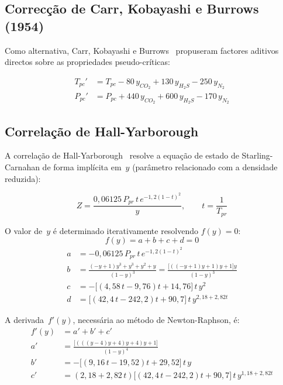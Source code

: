 \documentclass[12pt,a4paper]{article}
\begin{document}
\subsection{Correcção de Carr, Kobayashi e Burrows (1954)}

Como alternativa, Carr, Kobayashi e Burrows~\cite{CarrKB1954} propuseram factores
aditivos directos sobre as propriedades pseudo-críticas:

\begin{align}
  T_{pc}' &= T_{pc} - 80\,y_{CO_2} + 130\,y_{H_2S} - 250\,y_{N_2} \\
  P_{pc}' &= P_{pc} + 440\,y_{CO_2} + 600\,y_{H_2S} - 170\,y_{N_2}
\end{align}

\subsection{Correlação de Hall-Yarborough}

A correlação de Hall-Yarborough~\cite{HallYarborough1974} resolve a equação de
estado de Starling-Carnahan de forma implícita em~$y$ (parâmetro relacionado com
a densidade reduzida):

\begin{equation}
  Z = \frac{0{,}06125\,P_{pr}\,t\,e^{-1{,}2(1-t)^2}}{y}, \qquad t = \frac{1}{T_{pr}}
  \label{eq:Z_HY}
\end{equation}

O valor de~$y$ é determinado iterativamente resolvendo $f(y)=0$:
\begin{equation}
  f(y) = a + b + c + d = 0
\end{equation}
\begin{align}
  a &= -0{,}06125\,P_{pr}\,t\,e^{-1{,}2(1-t)^2}\\
  b &= \frac{(-y+1)y^3 + y^3 + y^2 + y}{(1-y)^3}
     = \frac{\bigl[((-y+1)y+1)y+1\bigr]y}{(1-y)^3}\\
  c &= -\bigl[(4{,}58\,t - 9{,}76)t + 14{,}76\bigr]\,t\,y^2\\
  d &= \bigl[(42{,}4\,t - 242{,}2)t + 90{,}7\bigr]\,t\,y^{2{,}18+2{,}82t}
\end{align}

A derivada~$f'(y)$, necessária ao método de Newton-Raphson, é:
\begin{align}
  f'(y) &= a' + b' + c'\\
  a' &= \frac{\bigl[(((y-4)y+4)y+4)y+1\bigr]}{(1-y)^4}\\
  b' &= -\bigl[(9{,}16\,t - 19{,}52)t + 29{,}52\bigr]\,t\,y\\
  c' &= (2{,}18+2{,}82\,t)\bigl[(42{,}4\,t-242{,}2)t+90{,}7\bigr]\,t\,y^{1{,}18+2{,}82t}
\end{align}
\end{document}
